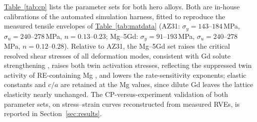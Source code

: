 \documentclass[preprint,12pt]{elsarticle}
\newcommand{\tabref}[1]{\hyperref[#1]{Table~\ref*{#1}}}
\begin{document}
\tabref{tab:cp} lists the parameter sets for both hero alloys. Both are in-house calibrations of the automated simulation harness, fitted to reproduce the measured tensile envelopes of \tabref{tab:matdata} (AZ31: $\sigma_y = 143$--$184$\,MPa, $\sigma_u = 240$--$278$\,MPa, $n = 0.13$--$0.23$; Mg--5Gd: $\sigma_y = 91$--$193$\,MPa, $\sigma_u = 240$--$278$\,MPa, $n = 0.12$--$0.28$). Relative to AZ31, the Mg--5Gd set raises the critical resolved shear stresses of all deformation modes, consistent with Gd solute strengthening \cite{PENG20121064}, raises both twin activation stresses, reflecting the suppressed twin activity of RE-containing Mg \cite{Mg-RE-texture-weakening}, and lowers the rate-sensitivity exponents; elastic constants and $c/a$ are retained at the Mg values, since dilute Gd leaves the lattice elasticity nearly unchanged. The CP-versus-experiment validation of both parameter sets, on stress--strain curves reconstructed from measured RVEs, is reported in Section~\ref{sec:results}.
\end{document}

